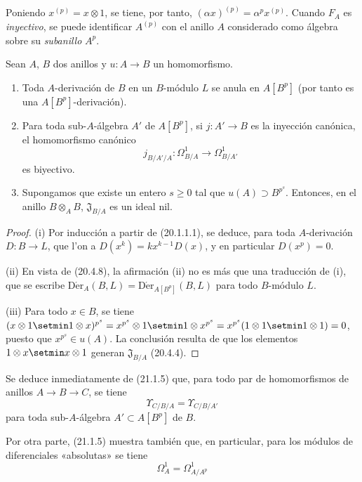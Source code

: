 Poniendo $x^{(p)}=x\otimes1$, se tiene, por tanto,
$(\alpha x)^{(p)}=\alpha^p x^{(p)}$. Cuando $F_A$ es \emph{inyectivo}, se puede
identificar $A^{(p)}$ con el anillo $A$ considerado como álgebra sobre su
\emph{subanillo} $A^p$.

\begin{proposition}[21.1.5]
\label{0.21.1.5-fr}
Sean $A$, $B$ dos anillos y $u:A\to B$ un homomorfismo.
\begin{enumerate}
  \item[\textup{(i)}] Toda $A$-derivación de $B$ en un $B$-módulo $L$ se anula en
  $A[B^p]$ (por tanto es una $A[B^p]$-derivación).
  \item[\textup{(ii)}] Para toda sub-$A$-álgebra $A'$ de $A[B^p]$, si
  $j:A'\to B$ es la inyección canónica, el homomorfismo canónico
  \[
  j_{B/A'/A}:\Omega^1_{B/A}\longrightarrow\Omega^1_{B/A'}
  \]
  es biyectivo.
  \item[\textup{(iii)}] Supongamos que existe un entero $s\geq0$ tal que
  $u(A)\supset B^{p^s}$. Entonces, en el anillo $B\otimes_A B$,
  $\mathfrak J_{B/A}$ es un ideal nil.
\end{enumerate}
\end{proposition}

\begin{proof}
(i) Por inducción a partir de (20.1.1.1), se deduce, para toda
$A$-derivación $D:B\to L$, que l'on a $D(x^k)=kx^{k-1}D(x)$, y en particular
$D(x^p)=0$.

(ii) En vista de (20.4.8), la afirmación (ii) no es más que una traducción
de (i), que se escribe
$\operatorname{D\acute{e}r}_A(B,L)=\operatorname{D\acute{e}r}_{A[B^p]}(B,L)$ para todo
$B$-módulo $L$.

(iii) Para todo $x\in B$, se tiene
$(x\otimes1\setmin1\otimes x)^{p^s}=x^{p^s}\otimes1\setmin1\otimes x^{p^s}=x^{p^s}(1\otimes1\setmin1\otimes1)=0$,
puesto que $x^{p^s}\in u(A)$. La conclusión resulta de que los elementos
$1\otimes x\setmin x\otimes1$ generan $\mathfrak J_{B/A}$ (20.4.4).
\end{proof}

Se deduce inmediatamente de (21.1.5) que, para todo par de homomorfismos de
anillos $A\to B\to C$, se tiene
\begin{equation}
\tag{21.1.5.1}
\label{0.21.1.5.1-fr}
\Upsilon_{C/B/A}=\Upsilon_{C/B/A'}
\end{equation}
para toda sub-$A$-álgebra $A'\subset A[B^p]$ de $B$.

Por otra parte, (21.1.5) muestra también que, en particular, para los módulos de
diferenciales «absolutas» se tiene
\begin{equation}
\tag{21.1.5.2}
\label{0.21.1.5.2-fr}
\Omega^1_A=\Omega^1_{A/A^p}
\end{equation}

